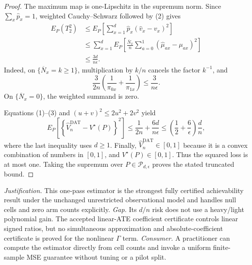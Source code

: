 \documentclass{article}
\begin{document}
\begin{proof}
The maximum map is one-Lipschitz in the supremum norm.  Since \(\sum_x\widehat p_x=1\), weighted Cauchy--Schwarz followed by (2) gives
\[
 \begin{aligned}
 E_P(T_2^2)
 &\le E_P\!\left[
   \sum_{x=1}^d\widehat p_x(\widehat v_x-v_x)^2
 \right]\\
 &\le \sum_{x=1}^d E_P\!\left[
   \frac{\overline N_x}{n}
   \sum_{a=0}^1(\widehat\mu_{ax}-\mu_{ax})^2
 \right]\\
 &\le \frac{3d}{n\epsilon}.
\tag{3}
 \end{aligned}
\]
Indeed, on \(\{\overline N_x=k\ge1\}\), multiplication by \(k/n\) cancels the factor \(k^{-1}\), and
\[
 \frac3{2n}\left(\frac1{\pi_{0x}}+\frac1{\pi_{1x}}\right)
 \le\frac3{n\epsilon}.
\]
On \(\{\overline N_x=0\}\), the weighted summand is zero.

Equations (1)--(3) and \((u+v)^2\le2u^2+2v^2\) yield
\[
 E_P\!\left[
  \left\{\widehat V_n^{\mathrm{DAT}}-V^\star(P)\right\}^2
 \right]
 \le \frac1{2n}+\frac{6d}{n\epsilon}
 \le \left(\frac12+\frac6\epsilon\right)\frac dn,
\]
where the last inequality uses \(d\ge1\).  Finally, \(\widehat V_n^{\mathrm{DAT}}\in[0,1]\) because it is a convex combination of numbers in \([0,1]\), and \(V^\star(P)\in[0,1]\).  Thus the squared loss is at most one.  Taking the supremum over \(P\in\mathcal P_{d,\epsilon}\) proves the stated truncated bound.
\end{proof}
\par\smallskip\noindent \textit{Justification.} This one-pass estimator is the strongest fully certified achievability result under the unchanged unrestricted observational model and handles null cells and zero arm counts explicitly. \textit{Gap.} Its \(d/n\) risk does not use a heavy/light polynomial gain. The accepted linear-ATE coefficient certificate controls linear signed ratios, but no simultaneous approximation and absolute-coefficient certificate is proved for the nonlinear \(\Gamma\) term. \textit{Consumer.} A practitioner can compute the estimator directly from cell counts and invoke a uniform finite-sample MSE guarantee without tuning or a pilot split.
\end{document}
